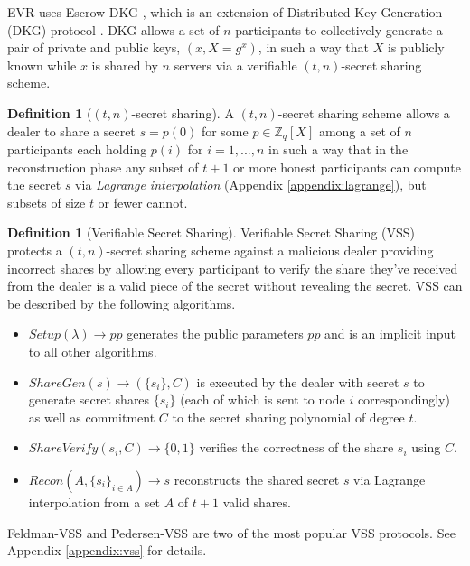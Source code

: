 \documentclass[letterpaper,twocolumn,10pt]{article}
\theoremstyle{definition}
\newtheorem{definition}[theorem]{Definition}
\theoremstyle{remark}
\begin{document}
EVR uses Escrow-DKG \cite{david2019rational}, which is an extension of Distributed Key Generation (DKG) protocol \cite{gennaro1999secure, gennaro3revisiting}. DKG allows a set of $n$ participants to collectively generate a pair of private and public keys, $(x,X = g^x )$, in such a way that $X$ is publicly known while $x$ is shared by $n$ servers via a verifiable $(t, n)$-secret sharing scheme.
\begin{definition}[$(t, n)$-secret sharing]
A $(t, n)$-secret sharing scheme \cite{shamir1979share, blakley1979safeguarding} allows a dealer to share a secret $s = p(0)$ for some $p \in \mathbb{Z}_q[X]$ among a set of $n$ participants each holding $p(i)$ for $i = 1, ..., n$ in such a way that in the reconstruction phase any subset of $t+1$ or more honest participants can compute the secret $s$ via \textit{Lagrange interpolation} (Appendix \ref{appendix:lagrange}), but subsets of size $t$ or fewer cannot.
\end{definition}
\begin{definition}[Verifiable Secret Sharing]
Verifiable Secret Sharing (VSS) \cite{feldman1987practical, pedersen1991non} protects a $(t, n)$-secret sharing scheme against a malicious dealer providing incorrect shares by allowing every participant to verify the share they've received from the dealer is a valid piece of the secret without revealing the secret. VSS can be described by the following algorithms.
\begin{itemize}
    \item $Setup(\lambda) \rightarrow pp$ generates the public parameters $pp$ and is an implicit input to all other algorithms.
    \item $ShareGen(s) \rightarrow (\{s_i\}, C)$ is executed by the dealer with secret $s$ to generate secret shares $\{s_i\}$ (each of which is sent to node $i$ correspondingly) as well as commitment $C$ to the secret sharing polynomial of degree $t$.
    \item $ShareVerify(s_i, C) \rightarrow \{0, 1\}$ verifies the correctness of the share $s_i$ using $C$.
    \item $Recon(A, \{s_i\}_{i \in A}) \rightarrow s$ reconstructs the shared secret $s$ via Lagrange interpolation from a set $A$ of $t + 1$ valid shares.
\end{itemize}
Feldman-VSS and Pedersen-VSS are two of the most popular VSS protocols. See Appendix \ref{appendix:vss} for details.
\end{definition}
\end{document}
